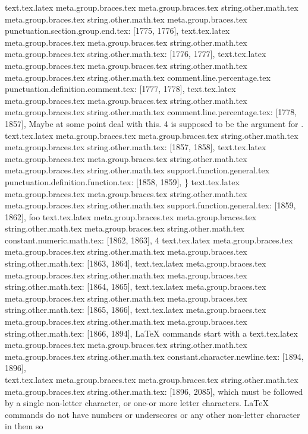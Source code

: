 {{{{{{{{{{{{{{{{{{{{{{{{{{{{{{{{{{{{{{{{{{{{{{{{{text.tex.latex meta.group.braces.tex meta.group.braces.tex string.other.math.tex meta.group.braces.tex string.other.math.tex meta.group.braces.tex punctuation.section.group.end.tex: [1775, 1776], {}}
text.tex.latex meta.group.braces.tex meta.group.braces.tex string.other.math.tex meta.group.braces.tex string.other.math.tex: [1776, 1777], {
}
text.tex.latex meta.group.braces.tex meta.group.braces.tex string.other.math.tex meta.group.braces.tex string.other.math.tex comment.line.percentage.tex punctuation.definition.comment.tex: [1777, 1778], {%
text.tex.latex meta.group.braces.tex meta.group.braces.tex string.other.math.tex meta.group.braces.tex string.other.math.tex comment.line.percentage.tex: [1778, 1857], { Maybe at some point deal with this. 4 is supposed to be the argument for \foo.}
text.tex.latex meta.group.braces.tex meta.group.braces.tex string.other.math.tex meta.group.braces.tex string.other.math.tex: [1857, 1858], {
}
text.tex.latex meta.group.braces.tex meta.group.braces.tex string.other.math.tex meta.group.braces.tex string.other.math.tex support.function.general.tex punctuation.definition.function.tex: [1858, 1859], {\}
text.tex.latex meta.group.braces.tex meta.group.braces.tex string.other.math.tex meta.group.braces.tex string.other.math.tex support.function.general.tex: [1859, 1862], {foo}
text.tex.latex meta.group.braces.tex meta.group.braces.tex string.other.math.tex meta.group.braces.tex string.other.math.tex constant.numeric.math.tex: [1862, 1863], {4}
text.tex.latex meta.group.braces.tex meta.group.braces.tex string.other.math.tex meta.group.braces.tex string.other.math.tex: [1863, 1864], {
}
text.tex.latex meta.group.braces.tex meta.group.braces.tex string.other.math.tex meta.group.braces.tex string.other.math.tex: [1864, 1865], {
}
text.tex.latex meta.group.braces.tex meta.group.braces.tex string.other.math.tex meta.group.braces.tex string.other.math.tex: [1865, 1866], {
}
text.tex.latex meta.group.braces.tex meta.group.braces.tex string.other.math.tex meta.group.braces.tex string.other.math.tex: [1866, 1894], {LaTeX commands start with a }
text.tex.latex meta.group.braces.tex meta.group.braces.tex string.other.math.tex meta.group.braces.tex string.other.math.tex constant.character.newline.tex: [1894, 1896], {\\}
text.tex.latex meta.group.braces.tex meta.group.braces.tex string.other.math.tex meta.group.braces.tex string.other.math.tex: [1896, 2085], { which must be followed by a single non-letter character, or one-or more letter characters.  LaTeX commands do not have numbers or underscores or any other non-letter character in them  so }
}}}}}}}}}}}}}}}}}}}}}}}}}}}}}}}}}}}}}}}}}}}}}}}}}}
